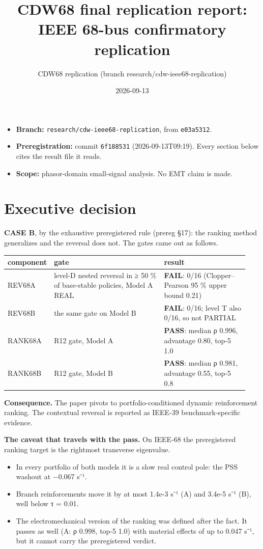 \documentclass[10pt,a4paper]{article}
\title{CDW68 final replication report: IEEE 68-bus confirmatory replication}
\date{2026-09-13}
\author{CDW68 replication (branch research/cdw-ieee68-replication)}
\begin{document}
\maketitle
\tableofcontents
\newpage
\begin{itemize}
\item \textbf{Branch:} \texttt{research/\allowbreak{}cdw-ieee68-replication}, from \texttt{e03a5312}.
\item \textbf{Preregistration:} commit \texttt{6f188531} (2026-09-13T09:19). Every section below cites the result file it reads.
\item \textbf{Scope:} phasor-domain small-signal analysis. No EMT claim is made.
\end{itemize}
\section{Executive decision}
\textbf{CASE B}, by the exhaustive preregistered rule (prereg §17): the ranking method generalizes and the reversal does not. The gates came out as follows.

{\small
\begin{longtable}{L{0.063\linewidth}L{0.498\linewidth}L{0.379\linewidth}}
\toprule
\textbf{component} & \textbf{gate} & \textbf{result} \\
\midrule
\endhead
REV68A & level-D nested reversal in ≥ 50 \% of base-stable policies, Model A REAL & \textbf{FAIL}: 0/16 (Clopper–Pearson 95 \% upper bound 0.21) \\
REV68B & the same gate on Model B & \textbf{FAIL}: 0/16; level T also 0/16, so not PARTIAL \\
RANK68A & R12 gate, Model A & \textbf{PASS}: median ρ 0.996, advantage 0.80, top-5 1.0 \\
RANK68B & R12 gate, Model B & \textbf{PASS}: median ρ 0.981, advantage 0.55, top-5 0.8 \\
\bottomrule
\end{longtable}}
\textbf{Consequence.} The paper pivots to portfolio-conditioned dynamic reinforcement ranking. The contextual reversal is reported as IEEE-39 benchmark-specific evidence.

\textbf{The caveat that travels with the pass.} On IEEE-68 the preregistered ranking target is the rightmost transverse eigenvalue.

\begin{itemize}
\item In every portfolio of both models it is a slow real control pole: the PSS washout at −0.067 s⁻¹.
\item Branch reinforcements move it by at most 1.4e-3 s⁻¹ (A) and 3.4e-5 s⁻¹ (B), well below τ = 0.01.
\item The electromechanical version of the ranking was defined after the fact. It passes as well (A: ρ 0.998, top-5 1.0) with material effects of up to 0.047 s⁻¹, but it cannot carry the preregistered verdict.
\end{itemize}
\end{document}
